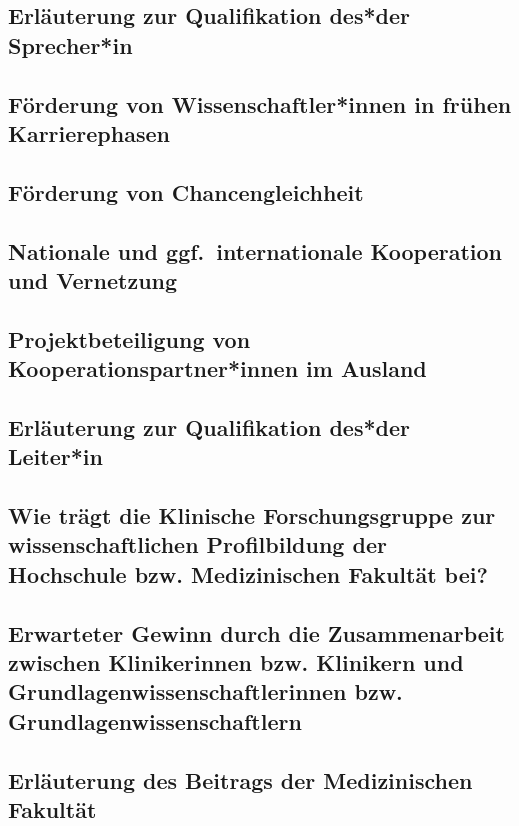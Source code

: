 \documentclass{scrartcl}
\begin{document}
\subsection{Erläuterung zur Qualifikation des*der Sprecher*in}

\subsection{Förderung von Wissenschaftler*innen in frühen Karrierephasen}

\subsection{Förderung von Chancengleichheit}

\subsection{Nationale und ggf.\ internationale Kooperation und Vernetzung}

\subsection{Projektbeteiligung von Kooperationspartner*innen im Ausland}

\subsection{Erläuterung zur Qualifikation des*der Leiter*in}

\subsection{Wie trägt die Klinische Forschungsgruppe zur wissenschaftlichen Profilbildung der Hochschule bzw. Medizinischen Fakultät bei?}

\subsection{Erwarteter Gewinn durch die Zusammenarbeit zwischen Klinikerinnen bzw. Klinikern und Grundlagenwissenschaftlerinnen bzw. Grundlagenwissenschaftlern}

\subsection{Erläuterung des Beitrags der Medizinischen Fakultät}
\end{document}

